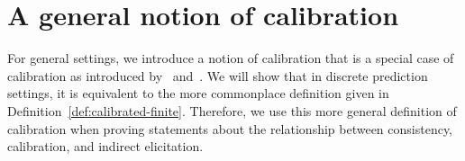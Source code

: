 \documentclass[anon,12pt]{colt2021} %
\newcommand{\Comments}{1}
\newcommand{\mytodo}[2]{\ifnum\Comments=1%
	\todo[linecolor=#1!80!black,backgroundcolor=#1,bordercolor=#1!80!black]{#2}\fi}
\newcommand{\jessiet}[1]{\mytodo{purple!20!white}{JF: #1}}
\begin{document}
%
%
%
%





\newpage
\appendix
\section{A general notion of calibration}\label{app:calibration}
For general settings, we introduce a notion of calibration that is a special case of calibration as introduced by~\citet[Definition 2.7]{steinwart2007compare} and~\citet[Chapter 3]{steinwart2008support}. 
We will show that in discrete prediction settings, it is equivalent to the more commonplace definition given in Definition~\ref{def:calibrated-finite}.
Therefore, we use this more general definition of calibration when proving statements about the relationship between consistency, calibration, and indirect elicitation.
\end{document}
